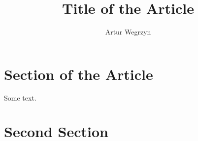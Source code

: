 \documentclass[12pt]{article}
\begin{document}
\title{Title of the Article}
\author{Artur Wegrzyn}
\maketitle

\tableofcontents

\section{Section of the Article}
Some text.
\section{Second Section}
\end{document}
